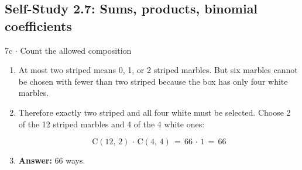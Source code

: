 \documentclass[11pt]{article}
\begin{document}
\begin{keepsection}\subsection{Self-Study 2.7: Sums, products, binomial coefficients}

\begin{workedbox}{7c \ensuremath{\cdot} Count the allowed composition}
\begin{enumerate}
\item At most two striped means 0, 1, or 2 striped marbles. But six marbles cannot be chosen with fewer than two striped because the box has only four white marbles.
\item {}
Therefore exactly two striped and all four white must be selected. Choose 2 of the 12 striped marbles and 4 of the 4 white ones:

\begin{equation*}\mathrm{C}(12,\, 2)\, \cdot \, \mathrm{C}(4,\, 4)\, =\, 66\, \cdot \, 1\, =\, 66\end{equation*}
\item \textbf{Answer:} 66 ways.
\end{enumerate}
\end{workedbox}

\end{keepsection}
\end{document}
